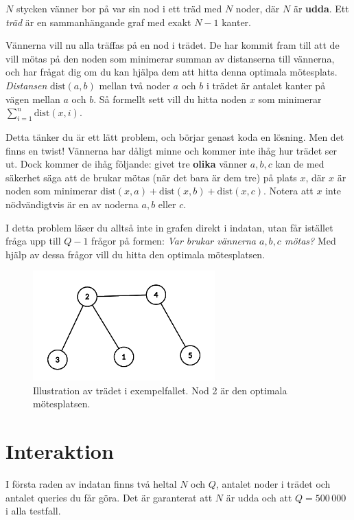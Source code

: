 
$N$ stycken vänner bor på var sin nod i ett träd med $N$ noder, där $N$ är \textbf{udda}.
Ett \emph{träd} är en sammanhängande graf med exakt $N-1$ kanter.

Vännerna vill nu alla träffas på en nod i trädet.
De har kommit fram till att de vill mötas på den noden som minimerar
summan av distanserna till vännerna, och har frågat dig om du kan hjälpa dem att
hitta denna optimala mötesplats.
\emph{Distansen} $\text{dist}(a,b)$ mellan två noder $a$ och $b$ i trädet är antalet
kanter på vägen mellan $a$ och $b$.
Så formellt sett vill du hitta noden $x$ som minimerar
$\sum_{i=1}^{n} \text{dist}(x,i)$.

Detta tänker du är ett lätt problem, och börjar genast koda en lösning.
Men det finns en twist!
Vännerna har dåligt minne och kommer inte ihåg hur trädet ser ut.
Dock kommer de ihåg följande: givet tre \textbf{olika} vänner
$a,b,c$ kan de med säkerhet säga att de brukar mötas (när det bara är dem tre) på plats
$x$, där $x$ är noden som minimerar
$\text{dist}(x,a) +\text{dist}(x,b) +\text{dist}(x,c)$.
Notera att $x$ inte nödvändigtvis är en av noderna $a,b$ eller $c$.

I detta problem läser du alltså inte in grafen direkt i indatan,
utan får istället fråga upp till $Q-1$ frågor på formen:
\emph{Var brukar vännerna $a,b,c$ mötas?}
Med hjälp av dessa frågor vill du hitta
den optimala mötesplatsen.

\begin{figure}[!h]
\begin{center}
  \includegraphics[width=7cm]{sample.png}
\end{center}
  \caption{Illustration av trädet i exempelfallet. Nod 2 är den optimala mötesplatsen.}
\end{figure}

\section*{Interaktion}

I första raden av indatan finns två heltal $N$ och $Q$,
antalet noder i trädet och antalet queries du får göra.
Det är garanterat att $N$ är udda och att $Q = 500\,000$ i alla testfall.

